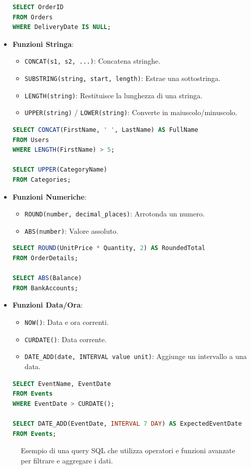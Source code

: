\begin{itemize}
\begin{lstlisting}[language=SQL, caption={Esempio Operatori di Confronto}]
SELECT OrderID
FROM Orders
WHERE DeliveryDate IS NULL;
    \end{lstlisting}
    \item \textbf{Funzioni Stringa}:
    \begin{itemize}
        \item \lstinline{CONCAT(s1, s2, ...)}: Concatena stringhe.
        \item \lstinline{SUBSTRING(string, start, length)}: Estrae una sottostringa.
        \item \lstinline{LENGTH(string)}: Restituisce la lunghezza di una stringa.
        \item \lstinline{UPPER(string)} / \lstinline{LOWER(string)}: Converte in maiuscolo/minuscolo.
    \end{itemize}
    \begin{lstlisting}[language=SQL, caption={Esempio Funzioni Stringa}]
SELECT CONCAT(FirstName, ' ', LastName) AS FullName
FROM Users
WHERE LENGTH(FirstName) > 5;

SELECT UPPER(CategoryName)
FROM Categories;
    \end{lstlisting}
    \item \textbf{Funzioni Numeriche}:
    \begin{itemize}
        \item \lstinline{ROUND(number, decimal_places)}: Arrotonda un numero.
        \item \lstinline{ABS(number)}: Valore assoluto.
    \end{itemize}
    \begin{lstlisting}[language=SQL, caption={Esempio Funzioni Numeriche}]
SELECT ROUND(UnitPrice * Quantity, 2) AS RoundedTotal
FROM OrderDetails;

SELECT ABS(Balance)
FROM BankAccounts;
    \end{lstlisting}
    \item \textbf{Funzioni Data/Ora}:
    \begin{itemize}
        \item \lstinline{NOW()}: Data e ora correnti.
        \item \lstinline{CURDATE()}: Data corrente.
        \item \lstinline{DATE_ADD(date, INTERVAL value unit)}: Aggiunge un intervallo a una data.
    \end{itemize}
    \begin{lstlisting}[language=SQL, caption={Esempio Funzioni Data/Ora}]
SELECT EventName, EventDate
FROM Events
WHERE EventDate > CURDATE();

SELECT DATE_ADD(EventDate, INTERVAL 7 DAY) AS ExpectedEventDate
FROM Events;
    \end{lstlisting}
\end{itemize}
\begin{figure}[h!]
    \centering
    \caption{Esempio di una query SQL che utilizza operatori e funzioni avanzate per filtrare e aggregare i dati.}
    \label{fig:query_sql_esempio}
\end{figure}